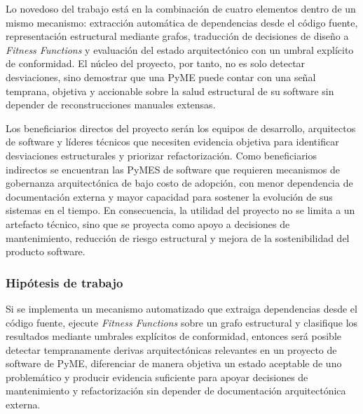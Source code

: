 Lo novedoso del trabajo está en la combinación de cuatro elementos dentro de un mismo mecanismo: extracción automática de dependencias desde el código fuente, representación estructural mediante grafos, traducción de decisiones de diseño a \textit{Fitness Functions} y evaluación del estado arquitectónico con un umbral explícito de conformidad. El núcleo del proyecto, por tanto, no es solo detectar desviaciones, sino demostrar que una PyME puede contar con una señal temprana, objetiva y accionable sobre la salud estructural de su software sin depender de reconstrucciones manuales extensas.

Los beneficiarios directos del proyecto serán los equipos de desarrollo, arquitectos de software y líderes técnicos que necesiten evidencia objetiva para identificar desviaciones estructurales y priorizar refactorización. Como beneficiarios indirectos se encuentran las PyMES de software que requieren mecanismos de gobernanza arquitectónica de bajo costo de adopción, con menor dependencia de documentación externa y mayor capacidad para sostener la evolución de sus sistemas en el tiempo. En consecuencia, la utilidad del proyecto no se limita a un artefacto técnico, sino que se proyecta como apoyo a decisiones de mantenimiento, reducción de riesgo estructural y mejora de la sostenibilidad del producto software.

\subsubsection{Hipótesis de trabajo}
Si se implementa un mecanismo automatizado que extraiga dependencias desde el código fuente, ejecute \textit{Fitness Functions} sobre un grafo estructural y clasifique los resultados mediante umbrales explícitos de conformidad, entonces será posible detectar tempranamente derivas arquitectónicas relevantes en un proyecto de software de PyME, diferenciar de manera objetiva un estado aceptable de uno problemático y producir evidencia suficiente para apoyar decisiones de mantenimiento y refactorización sin depender de documentación arquitectónica externa.

